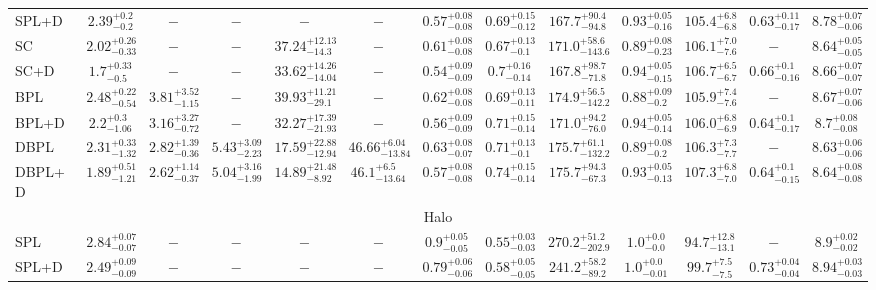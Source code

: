 \begin{table*}
{\begin{tabular}{lcccccccccccc}
\rowcolor{lightgray} SPL+D & $2.39^{+0.2}_{-0.2}$ & $-$ & $-$ & $-$ & $-$ & $0.57^{+0.08}_{-0.08}$ & $0.69^{+0.15}_{-0.12}$ & $167.7^{+90.4}_{-94.8}$ & $0.93^{+0.05}_{-0.16}$ & $105.4^{+6.8}_{-6.8}$ & $0.63^{+0.11}_{-0.17}$ & $8.78^{+0.07}_{-0.06}$ \\ 
SC & $2.02^{+0.26}_{-0.33}$ & $-$ & $-$ & $37.24^{+12.13}_{-14.3}$ & $-$ & $0.61^{+0.08}_{-0.08}$ & $0.67^{+0.13}_{-0.1}$ & $171.0^{+58.6}_{-143.6}$ & $0.89^{+0.08}_{-0.23}$ & $106.1^{+7.0}_{-7.6}$ & $-$ & $8.64^{+0.05}_{-0.05}$ \\ 
SC+D & $1.7^{+0.33}_{-0.5}$ & $-$ & $-$ & $33.62^{+14.26}_{-14.04}$ & $-$ & $0.54^{+0.09}_{-0.09}$ & $0.7^{+0.16}_{-0.14}$ & $167.8^{+98.7}_{-71.8}$ & $0.94^{+0.05}_{-0.15}$ & $106.7^{+6.5}_{-6.7}$ & $0.66^{+0.1}_{-0.16}$ & $8.66^{+0.07}_{-0.07}$ \\ 
BPL & $2.48^{+0.22}_{-0.54}$ & $3.81^{+3.52}_{-1.15}$ & $-$ & $39.93^{+11.21}_{-29.1}$ & $-$ & $0.62^{+0.08}_{-0.08}$ & $0.69^{+0.13}_{-0.11}$ & $174.9^{+56.5}_{-142.2}$ & $0.88^{+0.09}_{-0.2}$ & $105.9^{+7.4}_{-7.6}$ & $-$ & $8.67^{+0.07}_{-0.06}$ \\ 
BPL+D & $2.2^{+0.3}_{-1.06}$ & $3.16^{+3.27}_{-0.72}$ & $-$ & $32.27^{+17.39}_{-21.93}$ & $-$ & $0.56^{+0.09}_{-0.09}$ & $0.71^{+0.15}_{-0.14}$ & $171.0^{+94.2}_{-76.0}$ & $0.94^{+0.05}_{-0.14}$ & $106.0^{+6.8}_{-6.9}$ & $0.64^{+0.1}_{-0.17}$ & $8.7^{+0.08}_{-0.08}$ \\ 
DBPL & $2.31^{+0.33}_{-1.32}$ & $2.82^{+1.39}_{-0.36}$ & $5.43^{+3.09}_{-2.23}$ & $17.59^{+22.88}_{-12.94}$ & $46.66^{+6.04}_{-13.84}$ & $0.63^{+0.08}_{-0.07}$ & $0.71^{+0.13}_{-0.1}$ & $175.7^{+61.1}_{-132.2}$ & $0.89^{+0.08}_{-0.2}$ & $106.3^{+7.3}_{-7.7}$ & $-$ & $8.63^{+0.06}_{-0.06}$ \\ 
DBPL+D & $1.89^{+0.51}_{-1.21}$ & $2.62^{+1.14}_{-0.37}$ & $5.04^{+3.16}_{-1.99}$ & $14.89^{+21.48}_{-8.92}$ & $46.1^{+6.5}_{-13.64}$ & $0.57^{+0.08}_{-0.08}$ & $0.74^{+0.15}_{-0.14}$ & $175.7^{+94.3}_{-67.3}$ & $0.93^{+0.05}_{-0.13}$ & $107.3^{+6.8}_{-7.0}$ & $0.64^{+0.1}_{-0.15}$ & $8.64^{+0.08}_{-0.08}$ \\ 
\hline 
\multicolumn{13}{c}{Halo} \\ 
\hline 
SPL & $2.84^{+0.07}_{-0.07}$ & $-$ & $-$ & $-$ & $-$ & $0.9^{+0.05}_{-0.05}$ & $0.55^{+0.03}_{-0.03}$ & $270.2^{+51.2}_{-202.9}$ & $1.0^{+0.0}_{-0.0}$ & $94.7^{+12.8}_{-13.1}$ & $-$ & $8.9^{+0.02}_{-0.02}$ \\ 
\rowcolor{lightgray} SPL+D & $2.49^{+0.09}_{-0.09}$ & $-$ & $-$ & $-$ & $-$ & $0.79^{+0.06}_{-0.06}$ & $0.58^{+0.05}_{-0.05}$ & $241.2^{+58.2}_{-89.2}$ & $1.0^{+0.0}_{-0.01}$ & $99.7^{+7.5}_{-7.5}$ & $0.73^{+0.04}_{-0.04}$ & $8.94^{+0.03}_{-0.03}$ \\ 

\end{tabular}}
\end{table*}
